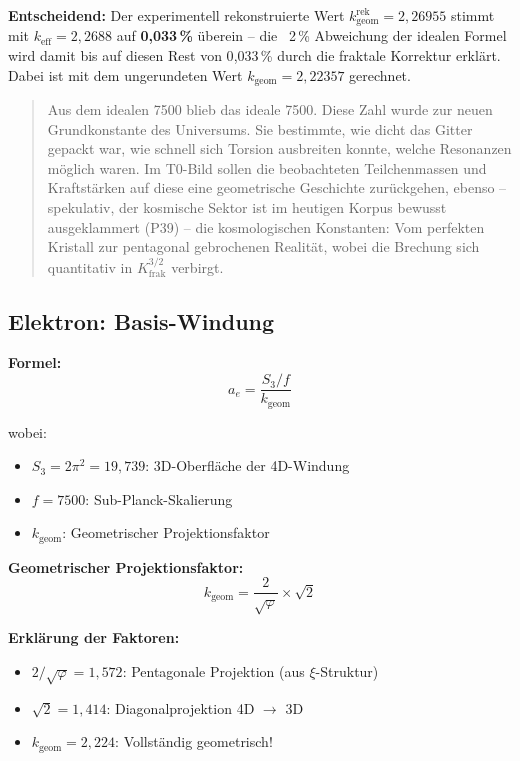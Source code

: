 	\textbf{Entscheidend:} Der experimentell rekonstruierte Wert \(k_\text{geom}^\text{rek} = 2{,}26955\) stimmt mit $k_\text{eff} = 2{,}2688$ auf \textbf{0{,}033\,\%} überein -- die ~2\,\% Abweichung der idealen Formel wird damit bis auf diesen Rest von 0{,}033\,\% durch die fraktale Korrektur erklärt. Dabei ist mit dem ungerundeten Wert $k_\text{geom} = 2{,}22357$ gerechnet.
	\begin{quotation}
		Aus dem idealen 7500 blieb das ideale 7500. Diese Zahl wurde zur neuen Grundkonstante des Universums. Sie bestimmte, wie dicht das Gitter gepackt war, wie schnell sich Torsion ausbreiten konnte, welche Resonanzen möglich waren.
		Im T0-Bild sollen die beobachteten Teilchenmassen und Kraftstärken auf diese eine geometrische Geschichte zurückgehen, ebenso -- spekulativ, der kosmische Sektor ist im heutigen Korpus bewusst ausgeklammert (P39) -- die kosmologischen Konstanten: Vom perfekten Kristall zur pentagonal gebrochenen Realität, wobei die Brechung sich quantitativ in $K_\text{frak}^{3/2}$ verbirgt.
	\end{quotation}
	
	\subsection{Elektron: Basis-Windung}
	
	\textbf{Formel:}
	\begin{equation}
		a_e = \frac{S_3/f}{k_{\text{geom}}}
		\label{eq:ae}
	\end{equation}
	
	wobei:
	\begin{itemize}
		\item $S_3 = 2\pi^2 = 19{,}739$: 3D-Oberfläche der 4D-Windung
		\item $f = 7500$: Sub-Planck-Skalierung
		\item $k_{\text{geom}}$: Geometrischer Projektionsfaktor
	\end{itemize}
	
	\textbf{Geometrischer Projektionsfaktor:}
	\begin{equation}
		k_{\text{geom}} = \frac{2}{\sqrt{\varphi}} \times \sqrt{2}
		\label{eq:kgeom}
	\end{equation}
	
	\textbf{Erklärung der Faktoren:}
	\begin{itemize}
		\item $2/\sqrt{\varphi} = 1{,}572$: Pentagonale Projektion (aus $\xi$-Struktur)
		\item $\sqrt{2} = 1{,}414$: Diagonalprojektion 4D $\to$ 3D
		\item $k_{\text{geom}} = 2{,}224$: Vollständig geometrisch!
	\end{itemize}
	
